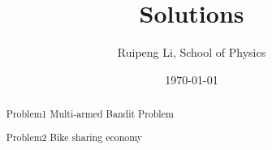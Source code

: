 \documentclass[letterpaper,12pt]{article}
\begin{document}
\title{Solutions}
\author{Ruipeng Li, School of Physics}
\date{\today}
\maketitle
\begin{abstract}	
Problem1 Multi-armed Bandit Problem\par
Problem2 Bike sharing economy\par
\end{abstract}
\end{document}
